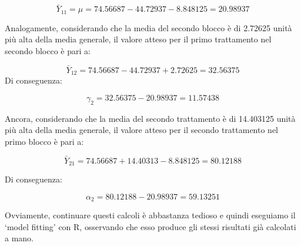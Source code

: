 \documentclass[a4paper,12pt,oneside]{book}
\begin{document}
\[ \bar{Y}_{11} = \mu = 74.56687 - 44.72937 - 8.848125 = 20.98937\]

Analogamente, considerando che la media del secondo blocco è di 2.72625 unità più alta della media generale, il valore atteso per il primo trattamento nel secondo blocco è pari a:

\[ \bar{Y}_{12} = 74.56687 - 44.72937 + 2.72625 = 32.56375\]
Di conseguenza:

\[ \gamma_2 = 32.56375 - 20.98937 = 11.57438\]

Ancora, considerando che la media del secondo trattamento è di 14.403125 unità più alta della media generale, il valore atteso per il secondo trattamento nel primo blocco è pari a:

\[ \bar{Y}_{21} = 74.56687 + 14.40313 - 8.848125 = 80.12188\]

Di conseguenza:

\[ \alpha_2 = 80.12188 - 20.98937 = 59.13251\]

Ovviamente, continuare questi calcoli è abbastanza tedioso e quindi eseguiamo il `model fitting' con R, osservando che esso produce gli stessi risultati già calcolati a mano.

\scriptsize
\end{document}
